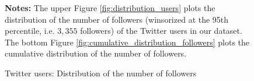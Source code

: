 \clearpage
\pagebreak
\begin{figure}
\begin{center}
\quad
\end{center}
	\begin{spacing}{0.5}
		{\footnotesize \textbf{Notes:} The upper Figure \ref{fig:distribution_users} plots the distribution of the number of followers (winsorized at the 95th percentile, i.e. $3,355$ followers) of the Twitter users in our dataset. The bottom Figure \ref{fig:cumulative_distribution_followers} plots the cumulative distribution of the number of followers.}
	\end{spacing}
\vspace{.5cm}	
	\caption{Twitter users: Distribution of the number of followers}
	\label{fig:users}
\end{figure}


